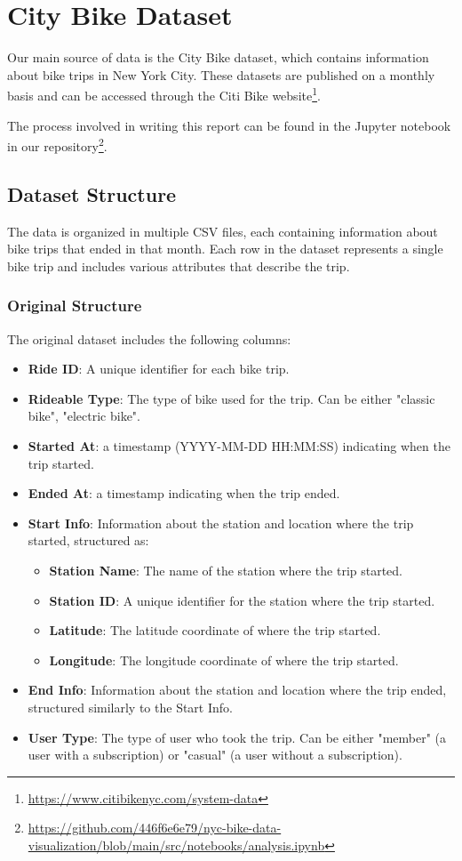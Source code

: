 \section{City Bike Dataset}
Our main source of data is the City Bike dataset, which contains information about bike trips in New York City.
These datasets are published on a monthly basis and can be accessed through the Citi Bike website\footnote{\url{https://www.citibikenyc.com/system-data}}.

The process involved in writing this report can be found in the Jupyter notebook in our repository\footnote{\url{https://github.com/446f6e6e79/nyc-bike-data-visualization/blob/main/src/notebooks/analysis.ipynb}}.

\subsection{Dataset Structure}
The data is organized in multiple CSV files, each containing information about bike trips that ended in that month. 
Each row in the dataset represents a single bike trip and includes various attributes that describe the trip.
\subsubsection{Original Structure}
The original dataset includes the following columns:
\begin{itemize}
    \item \textbf{Ride ID}: A unique identifier for each bike trip.
    \item \textbf{Rideable Type}: The type of bike used for the trip. Can be either "classic bike", "electric bike".
    \item \textbf{Started At}: a timestamp (YYYY-MM-DD HH:MM:SS) indicating when the trip started.
    \item \textbf{Ended At}: a timestamp indicating when the trip ended.
    \item \textbf{Start Info}: Information about the station and location where the trip started, structured as:
    \begin{itemize}
        \item \textbf{Station Name}: The name of the station where the trip started.
        \item \textbf{Station ID}: A unique identifier for the station where the trip started.
        \item \textbf{Latitude}: The latitude coordinate of where the trip started.
        \item \textbf{Longitude}: The longitude coordinate of where the trip started.
    \end{itemize}
    \item \textbf{End Info}: Information about the station and location where the trip ended, structured similarly to the Start Info.
    \item \textbf{User Type}: The type of user who took the trip. Can be either "member" (a user with a subscription) or "casual" (a user without a subscription).
\end{itemize}

